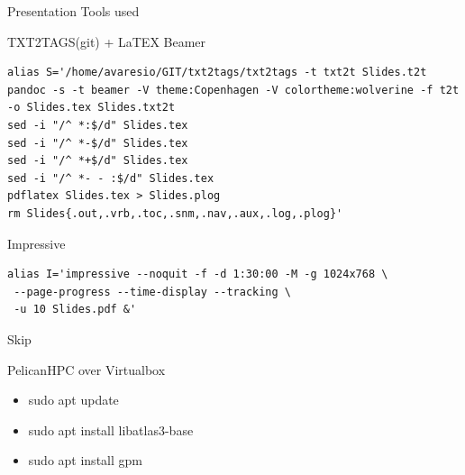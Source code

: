 \documentclass[ignorenonframetext,]{beamer}
\providecommand{\tightlist}{%
  \setlength{\itemsep}{0pt}\setlength{\parskip}{0pt}}
\begin{document}
\begin{frame}[fragile]{Presentation Tools used}

\begin{block}{TXT2TAGS(git) + LaTEX Beamer}

\begin{verbatim}
alias S='/home/avaresio/GIT/txt2tags/txt2tags -t txt2t Slides.t2t
pandoc -s -t beamer -V theme:Copenhagen -V colortheme:wolverine -f t2t -o Slides.tex Slides.txt2t
sed -i "/^ *:$/d" Slides.tex
sed -i "/^ *-$/d" Slides.tex
sed -i "/^ *+$/d" Slides.tex
sed -i "/^ *- - :$/d" Slides.tex
pdflatex Slides.tex > Slides.plog
rm Slides{.out,.vrb,.toc,.snm,.nav,.aux,.log,.plog}'
\end{verbatim}

\end{block}

\begin{block}{Impressive}

\begin{verbatim}
alias I='impressive --noquit -f -d 1:30:00 -M -g 1024x768 \
 --page-progress --time-display --tracking \
 -u 10 Slides.pdf &'
\end{verbatim}

\end{block}

\end{frame}

\begin{frame}{Skip}

\end{frame}

\begin{frame}{PelicanHPC over Virtualbox}

\begin{itemize}
\tightlist
\item
  sudo apt update
\item
  sudo apt install libatlas3-base
\item
  sudo apt install gpm
\end{itemize}


\end{frame}
\end{document}
